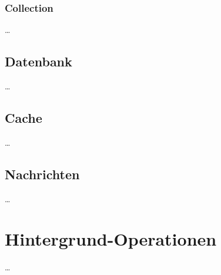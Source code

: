 \subsubsection{Collection}

\dots


\FloatBarrier

\subsection{Datenbank}

\dots


\subsection{Cache}

\dots

\subsection{Nachrichten}

\dots



\section{Hintergrund-Operationen}

\dots



